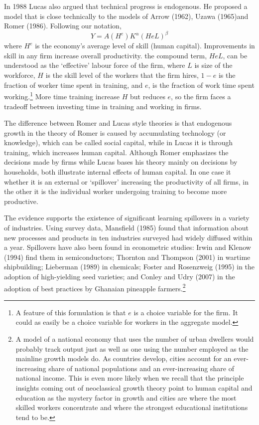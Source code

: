 {In 1988 Lucas also argued that technical progress is endogenous. He proposed a model that is  close technically to the models of Arrow (1962), Uzawa (1965)and Romer (1986). Following our notation, 
\[ Y = A(H^e) K^\alpha (HeL)^\beta \] 
where $H^e$ is the economy's average level of skill (human capital).  Improvements in skill in any firm  increase overall productivity.  the compound term, $HeL$,  can be understood as the `effective' labour force of the firm, where $L$ is size of the workforce, $H$ is the skill level of the  workers that the firm hires,  $1-e$ is the fraction of worker time  spent in training, and $e$, is the fraction of work time spent working.\footnote{A feature of this formulation is that $e$ is a choice variable for the firm. It could as easily be a choice variable for workers in the aggregate model.} 
More time training increase $H$ but reduces $e$, so the firm faces a tradeoff between investing time in training and working in firms.

The difference between Romer and Lucas style theories is that endogenous growth in the theory of Romer is caused by accumulating technology (or knowledge), which can be called social capital, while in Lucas it is through training, which increases human capital. %
Although Romer emphasizes the decisions made by firms while Lucas bases his theory mainly on  decisions by households, both illustrate internal effects of human capital. In one case it whether it is an external or `spillover' increasing the productivity of all firms, in the other it is the individual worker undergoing training to become more productive. 

The evidence supports the existence of significant learning spillovers in a variety of industries. Using survey data, Mansfield (1985) found that information about new processes and products in ten industries surveyed had widely diffused within a year. Spillovers have also been found in econometric studies: Irwin and Klenow (1994) find them in semiconductors; Thornton and Thompson (2001) in wartime shipbuilding; Lieberman (1989) in chemicals; Foster and Rosenzweig (1995) in the adoption of high-yielding seed varieties; and Conley and Udry (2007) in the adoption of best practices by Ghanaian pineapple farmers.\footnote{A model of a national economy that uses the number of urban dwellers would probably track output just as well as one using the number employed as the mainline growth models do. As countries develop, cities account for an ever-increasing share of  national populations and an ever-increasing share of national income.  This is  even more likely when we recall that the principle insights coming out of neoclassical growth theory point to human capital and education as the mystery factor in growth and cities are where the most skilled workers concentrate and where the strongest educational institutions tend to be.} 

}

